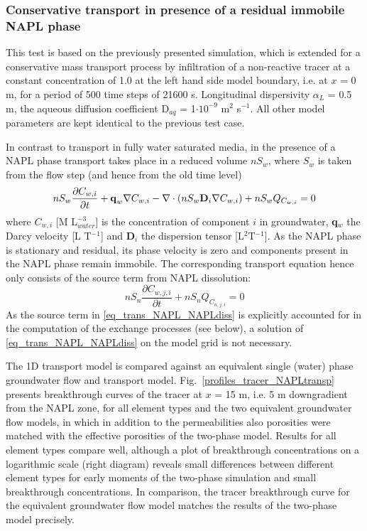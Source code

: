 \subsubsection{Conservative transport in presence of a residual immobile NAPL phase}
\label{NAPL_diss_BM_transport}

This test is based on the previously presented simulation, which is extended for a conservative mass transport process by infiltration of a non-reactive tracer at a constant concentration of 1.0 at the left hand side model boundary, i.e. at $x$ = 0 m, for a period of 500 time steps of 21600 s. Longitudinal dispersivity  $\alpha_L$ = 0.5 m, the aqueous diffusion coefficient D$_{aq}$ = 1$\cdot10^{-9}$ m$^2$ s$^{-1}$. All other model parameters are kept identical to the previous test case.

In contrast to transport in fully water saturated media, in the presence of a NAPL phase transport takes place in a reduced volume $nS_w$, where $S_w$ is taken from the flow step (and hence from the old time level)
\begin{equation}
    n S_w\frac{\partial C_{w,i}}{\partial t} + \textbf{\textrm{q}}_w \nabla C_{w,i} - \nabla \cdot\left( nS_w\textbf{\textrm{D}}_i \nabla C_{w,i} \right)+nS_wQ_{C_{w,i}}=0
    \label{eq_trans_water_NAPLdiss}
\end{equation}
where $C_{w,i}$  [M L$^{-3}_{water}$] is the concentration of component $i$ in groundwater, \textbf{q}$_w$ the Darcy velocity [L T$^{-1}$] and \textbf{D}$_i$ the dispersion tensor [L$^2$T$^{-1}$]. As the NAPL phase is stationary and residual, its phase velocity is zero and components present in the NAPL phase remain immobile. The corresponding transport equation hence only consists of the source term from NAPL dissolution:
\begin{equation}
    n S_n\frac{\partial C_{w,j,i}}{\partial t} +nS_nQ_{C_{n,j,i}}=0
    \label{eq_trans_NAPL_NAPLdiss}
\end{equation}
As the source term in \ref{eq_trans_NAPL_NAPLdiss} is explicitly accounted for in the computation of the exchange processes (see below), a solution of \ref{eq_trans_NAPL_NAPLdiss} on the model grid is not necessary.

The 1D transport model is compared against an equivalent single (water) phase groundwater flow and transport model. Fig.~\ref{profiles_tracer_NAPLtransp} presents breakthrough curves of the tracer at $x$ = 15 m, i.e. 5 m downgradient from the NAPL zone, for all element types and the two equivalent groundwater flow models, in which in addition to the permeabilities also porosities were matched with the effective porosities of the two-phase model. Results for all element types compare well, although a plot of breakthrough concentrations on a logarithmic scale (right diagram) reveals small differences between different element types for early moments of the two-phase simulation and small breakthrough concentrations. In comparison, the tracer breakthrough curve for the equivalent groundwater flow model matches the results of the two-phase model precisely.

